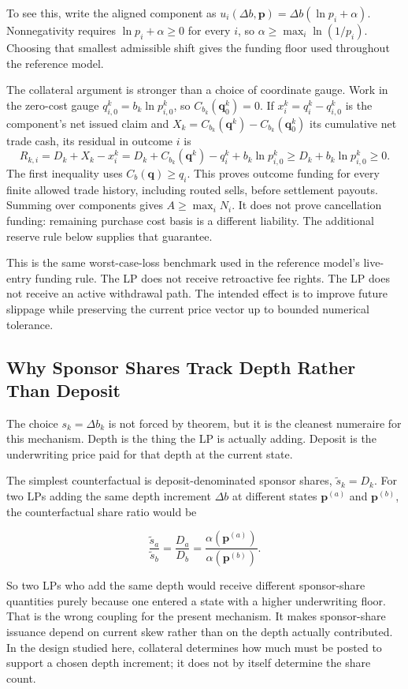 \documentclass[10pt]{article}
\begin{document}
To see this, write the aligned component as $u_i(\Delta b,\mathbf{p}) = \Delta b(\ln p_i + \alpha)$. Nonnegativity requires $\ln p_i + \alpha \ge 0$ for every $i$, so $\alpha \ge \max_i \ln(1/p_i)$. Choosing that smallest admissible shift gives the funding floor used throughout the reference model.

The collateral argument is stronger than a choice of coordinate gauge. Work in the zero-cost gauge $q^k_{i,0}=b_k\ln p^k_{i,0}$, so $C_{b_k}(\mathbf q^k_0)=0$. If $x^k_i=q^k_i-q^k_{i,0}$ is the component's net issued claim and $X_k=C_{b_k}(\mathbf q^k)-C_{b_k}(\mathbf q^k_0)$ its cumulative net trade cash, its residual in outcome $i$ is
\[
R_{k,i}=D_k+X_k-x^k_i
       =D_k+C_{b_k}(\mathbf q^k)-q^k_i+b_k\ln p^k_{i,0}
       \ge D_k+b_k\ln p^k_{i,0}\ge0.
\]
The first inequality uses $C_b(\mathbf q)\ge q_i$. This proves outcome funding for every finite allowed trade history, including routed sells, before settlement payouts. Summing over components gives $A\ge\max_i N_i$. It does not prove cancellation funding: remaining purchase cost basis is a different liability. The additional reserve rule below supplies that guarantee.

This is the same worst-case-loss benchmark used in the reference model's live-entry funding rule. The LP does not receive retroactive fee rights. The LP does not receive an active withdrawal path. The intended effect is to improve future slippage while preserving the current price vector up to bounded numerical tolerance.

\subsection{Why Sponsor Shares Track Depth Rather Than Deposit}

The choice $s_k = \Delta b_k$ is not forced by theorem, but it is the cleanest numeraire for this mechanism. Depth is the thing the LP is actually adding. Deposit is the underwriting price paid for that depth at the current state.

The simplest counterfactual is deposit-denominated sponsor shares, $\tilde s_k = D_k$. For two LPs adding the same depth increment $\Delta b$ at different states $\mathbf{p}^{(a)}$ and $\mathbf{p}^{(b)}$, the counterfactual share ratio would be

\[
\frac{\tilde s_a}{\tilde s_b} = \frac{D_a}{D_b} = \frac{\alpha(\mathbf{p}^{(a)})}{\alpha(\mathbf{p}^{(b)})}.
\]

So two LPs who add the same depth would receive different sponsor-share quantities purely because one entered a state with a higher underwriting floor. That is the wrong coupling for the present mechanism. It makes sponsor-share issuance depend on current skew rather than on the depth actually contributed. In the design studied here, collateral determines how much must be posted to support a chosen depth increment; it does not by itself determine the share count.
\end{document}
